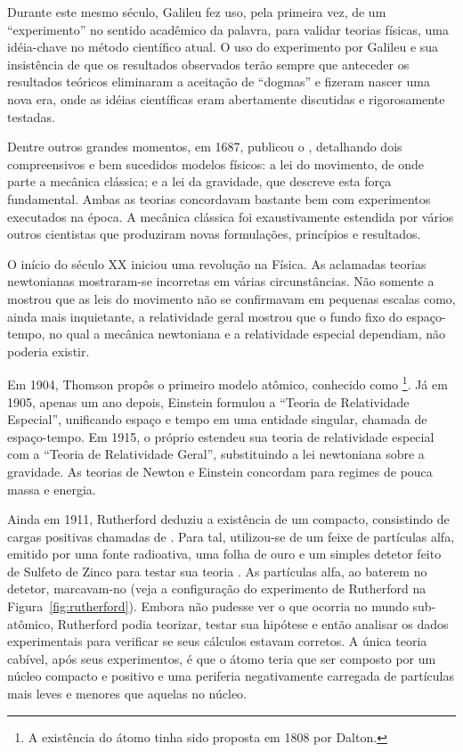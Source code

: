 Durante este mesmo século, Galileu fez uso, pela primeira vez, de um
``experimento'' no sentido acadêmico da palavra, para validar teorias físicas,
uma idéia-chave no método científico atual. O uso do experimento por Galileu e
sua insistência de que os resultados observados terão sempre que anteceder os
resultados teóricos eliminaram a aceitação de ``dogmas'' e fizeram nascer uma
nova era, onde as idéias científicas eram abertamente discutidas e
rigorosamente testadas.

Dentre outros grandes momentos, em 1687,  publicou o
, detalhando dois compreensivos e bem sucedidos
modelos físicos: a lei do movimento, de onde parte a mecânica clássica; e a
lei da gravidade, que descreve esta força fundamental. Ambas as teorias
concordavam bastante bem com experimentos executados na época. A mecânica
clássica foi exaustivamente estendida por vários outros cientistas que
produziram novas formulações, princípios e resultados.

O início do século XX iniciou uma revolução na Física. As aclamadas teorias
newtonianas mostraram-se incorretas em várias circunstâncias. Não somente a
 mostrou que as leis do movimento não se confirmavam em
pequenas escalas como, ainda mais inquietante, a relatividade geral mostrou
que o fundo fixo do espaço-tempo, no qual a mecânica newtoniana e a
relatividade especial dependiam, não poderia existir.

Em 1904, Thomson propôs o primeiro modelo atômico, conhecido como
\footnote{A existência do átomo tinha sido proposta
em 1808 por Dalton.}. Já em 1905, apenas um ano depois, Einstein formulou a
``Teoria de Relatividade Especial'', unificando espaço e tempo em uma entidade
singular, chamada de espaço-tempo. Em 1915, o próprio estendeu sua teoria de
relatividade especial com a ``Teoria de Relatividade Geral'', substituindo a
lei newtoniana sobre a gravidade. As teorias de Newton e Einstein concordam
para regimes de pouca massa e energia.

Ainda em 1911, Rutherford deduziu a existência de um 
compacto, consistindo de cargas positivas chamadas de . Para tal,
utilizou-se de um feixe de partículas alfa, emitido por uma fonte radioativa,
uma folha de ouro e um simples detetor feito de Sulfeto de Zinco para testar
sua teoria \cite{halliday}. As partículas alfa, ao baterem no detetor,
marcavam-no (veja a configuração do experimento de Rutherford na
Figura~\ref{fig:rutherford}). Embora não pudesse ver o que ocorria no mundo
sub-atômico, Rutherford podia teorizar, testar sua hipótese e então analisar
os dados experimentais para verificar se seus cálculos estavam corretos. A
única teoria cabível, após seus experimentos, é que o átomo teria que ser
composto por um núcleo compacto e positivo e uma periferia negativamente
carregada de partículas mais leves e menores que aquelas no núcleo.

